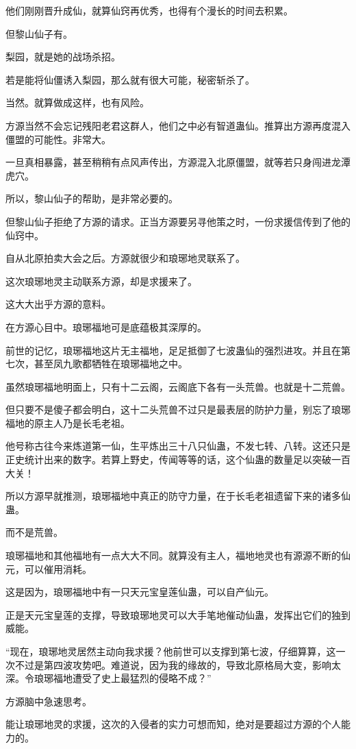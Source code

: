 \begin{this_body}
他们刚刚晋升成仙，就算仙窍再优秀，也得有个漫长的时间去积累。

但黎山仙子有。

梨园，就是她的战场杀招。

若是能将仙僵诱入梨园，那么就有很大可能，秘密斩杀了。

当然。就算做成这样，也有风险。

方源当然不会忘记残阳老君这群人，他们之中必有智道蛊仙。推算出方源再度混入僵盟的可能性。非常大。

一旦真相暴露，甚至稍稍有点风声传出，方源混入北原僵盟，就等若只身闯进龙潭虎穴。

所以，黎山仙子的帮助，是非常必要的。

但黎山仙子拒绝了方源的请求。正当方源要另寻他策之时，一份求援信传到了他的仙窍中。

自从北原拍卖大会之后。方源就很少和琅琊地灵联系了。

这次琅琊地灵主动联系方源，却是求援来了。

这大大出乎方源的意料。

在方源心目中。琅琊福地可是底蕴极其深厚的。

前世的记忆，琅琊福地这片无主福地，足足抵御了七波蛊仙的强烈进攻。并且在第七次，甚至凤九歌都牺牲在琅琊福地之中。

虽然琅琊福地明面上，只有十二云阁，云阁底下各有一头荒兽。也就是十二荒兽。

但只要不是傻子都会明白，这十二头荒兽不过只是最表层的防护力量，别忘了琅琊福地的原主人乃是长毛老祖。

他号称古往今来炼道第一仙，生平炼出三十八只仙蛊，不发七转、八转。这还只是正史统计出来的数字。若算上野史，传闻等等的话，这个仙蛊的数量足以突破一百大关！

所以方源早就推测，琅琊福地中真正的防守力量，在于长毛老祖遗留下来的诸多仙蛊。

而不是荒兽。

琅琊福地和其他福地有一点大大不同。就算没有主人，福地地灵也有源源不断的仙元，可以催用消耗。

这是因为，琅琊福地中有一只天元宝皇莲仙蛊，可以自产仙元。

正是天元宝皇莲的支撑，导致琅琊地灵可以大手笔地催动仙蛊，发挥出它们的独到威能。

“现在，琅琊地灵居然主动向我求援？他前世可以支撑到第七波，仔细算算，这一次不过是第四波攻势吧。难道说，因为我的缘故的，导致北原格局大变，影响太深。令琅琊福地遭受了史上最猛烈的侵略不成？”

方源脑中急速思考。

能让琅琊地灵的求援，这次的入侵者的实力可想而知，绝对是要超过方源的个人能力的。


\end{this_body}
